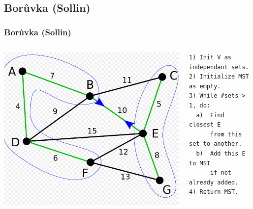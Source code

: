 \documentclass{beamer}
\begin{document}
\subsection{Borůvka (Sollin)}
\begin{frame}[fragile]
\frametitle{Borůvka (Sollin)}
\begin{columns}
\begin{column}{.4\linewidth}
\includegraphics[scale=.22]{Sollin.png}
\end{column}

\begin{column}{.5\linewidth}
\begin{verbatim}
1) Init V as independant sets.
2) Initialize MST as empty.
3) While #sets > 1, do:
  a)  Find closest E 
      from this set to another.
  b)  Add this E to MST 
      if not already added.  
4) Return MST.
\end{verbatim}
\end{column}
\end{columns}
\end{frame}
\end{document}
